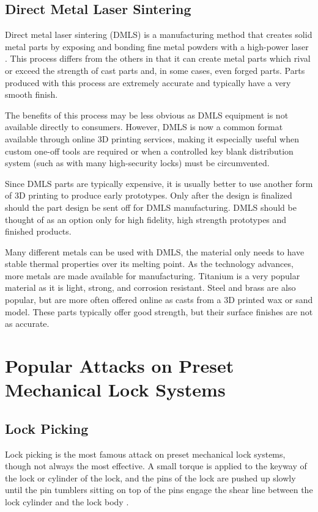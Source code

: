 \documentclass{acm_proc_article-sp}
\begin{document}
\subsection{Direct Metal Laser Sintering}
Direct metal laser sintering (DMLS) is a manufacturing method that creates solid metal parts by exposing and bonding fine metal powders with a high-power laser \cite{DAS}. This process differs from the others in that it can create metal parts which rival or exceed the strength of cast parts and, in some cases, even forged parts. Parts produced with this process are extremely accurate and typically have a very smooth finish.

The benefits of this process may be less obvious as DMLS equipment is not available directly to consumers. However, DMLS is now a common format available through online 3D printing services, making it especially useful when custom one-off tools are required or when a controlled key blank distribution system (such as with many high-security locks) must be circumvented.

Since DMLS parts are typically expensive, it is usually better to use another form of 3D printing to produce early prototypes. Only after the design is finalized should the part design be sent off for DMLS manufacturing. DMLS should be thought of as an option only for high fidelity, high strength prototypes and finished products.

Many different metals can be used with DMLS, the material only needs to have stable thermal properties over its melting point. As the technology advances, more metals are made available for manufacturing. Titanium is a very popular material as it is light, strong, and corrosion resistant. Steel and brass are also popular, but are more often offered online as casts from a 3D printed wax or sand model. These parts typically offer good strength, but their surface finishes are not as accurate.

\section{Popular Attacks on Preset Mechanical Lock Systems}
\subsection{Lock Picking}
Lock picking is the most famous attack on preset mechanical lock systems, though not always the most effective. A small torque is applied to the keyway of the lock or cylinder of the lock, and the pins of the lock are pushed up slowly until the pin tumblers sitting on top of the pins engage the shear line between the lock cylinder and the lock body \cite{TOOOL1}.
\end{document}
